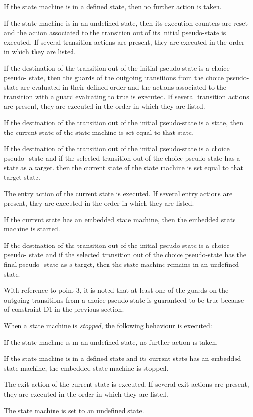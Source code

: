 \documentclass[definition]{../fwprofile}
\begin{document}
\begin{fw_enumerate}
\item If the state machine is in a defined state, then no further action is taken.
\item If the state machine is in an undefined state, then its execution counters are reset
and the action associated to the transition
out of its initial pseudo-state is executed. If several transition actions are present, they
are executed in the order in which they are listed.
\item If the destination of the transition out of the initial pseudo-state is a choice pseudo-
state, then the guards of the outgoing transitions from the choice pseudo-state are
evaluated in their defined order and the actions associated to the transition with a guard evaluating to true is
executed. If several transition actions are present, they are executed in the order in
which they are listed.
\item If the destination of the transition out of the initial pseudo-state is a state, then the
current state of the state machine is set equal to that state.
\item If the destination of the transition out of the initial pseudo-state is a choice pseudo-
state and if the selected transition out of the choice pseudo-state has a state as a target,
then the current state of the state machine is set equal to that target state.
\item The entry action of the current state is executed. If several entry actions are present,
they are executed in the order in which they are listed.
\item If the current state has an embedded state machine, then the embedded state machine is
started.
\item If the destination of the transition out of the initial pseudo-state is a choice pseudo-
state and if the selected transition out of the choice pseudo-state has the final pseudo-
state as a target, then the state machine remains in an undefined state.
\end{fw_enumerate}

With reference to point 3, it is noted that at least one of the guards on the outgoing transitions
from a choice pseudo-state is guaranteed to be true because of constraint D1 in the previous
section.

When a state machine is \emph{stopped}, the following behaviour is executed:
\begin{fw_enumerate}
\item If the state machine is in an undefined state, no further action is taken.
\item If the state machine is in a defined state and its current state has an embedded state
machine, the embedded state machine is stopped.
\item The exit action of the current state is executed. If several exit actions are present, they
are executed in the order in which they are listed.
\item The state machine is set to an undefined state.
\end{fw_enumerate}
\end{document}
